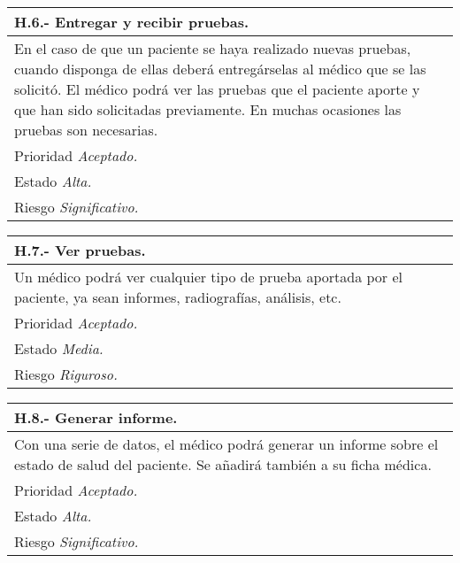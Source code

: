 \documentclass[a4paper,oneside,11pt]{book}
\begin{document}
\begin{center}
\begin{tabulary}{15cm}{|L|}
	\hline
		\bf{H.6.- Entregar y recibir pruebas.} \\
	\hline
		En el caso de que un paciente se haya realizado nuevas pruebas, cuando disponga de ellas deberá entregárselas al médico que se las solicitó. El médico podrá ver las pruebas que el paciente aporte y que han sido solicitadas previamente. En muchas ocasiones las pruebas son necesarias. \\
	\hline
		Prioridad \textit{Aceptado.} \\
	\hline
		Estado \textit{Alta.} \\
	\hline
		Riesgo \textit{Significativo.} \\
	\hline
\end{tabulary}
\end{center}

\begin{center}
\begin{tabulary}{15cm}{|L|}
	\hline
		\bf{H.7.- Ver pruebas.} \\
	\hline
		Un médico podrá ver cualquier tipo de prueba aportada por el paciente, ya sean informes, radiografías, análisis, etc. \\
	\hline
		Prioridad \textit{Aceptado.} \\
	\hline
		Estado \textit{Media.} \\
	\hline
		Riesgo \textit{Riguroso.} \\
	\hline
\end{tabulary}
\end{center}

\begin{center}
\begin{tabulary}{15cm}{|L|}
	\hline
		\bf{H.8.- Generar informe.} \\
	\hline
		Con una serie de datos, el médico podrá generar un informe sobre el estado de salud del paciente. Se añadirá también a su ficha médica. \\
	\hline
		Prioridad \textit{Aceptado.} \\
	\hline
		Estado \textit{Alta.} \\
	\hline
		Riesgo \textit{Significativo.} \\
	\hline
\end{tabulary}
\end{center}
\end{document}
